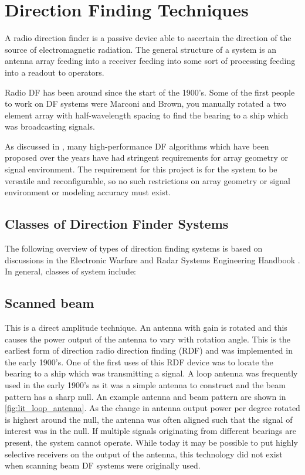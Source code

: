 \section{Direction Finding Techniques}
A radio direction finder is a passive device able to ascertain the direction of the source of electromagnetic radiation. 
The general structure of a system is an antenna array feeding into a receiver feeding into some sort of processing feeding into a readout to operators.

Radio DF has been around since the start of the 1900's. Some of the first people to work on DF  systems were Marconi and Brown, you manually rotated a two element array with half-wavelength spacing to find the bearing to a ship which was broadcasting signals. 

As discussed in \cite{farrier1990direction}, many high-performance DF algorithms which have been proposed over the years have had stringent requirements for array geometry or signal environment. The requirement for this project is for the system to be versatile and reconfigurable, so no such restrictions on array geometry or signal environment or modeling accuracy must exist. 

\subsection{Classes of Direction Finder Systems}
The following overview of types of direction finding systems is based on discussions in the Electronic Warfare and Radar Systems Engineering Handbook \cite{desk1997electronic}.
In general, classes of system include:

\subsection{Scanned beam}
This is a direct amplitude technique. An antenna with gain is rotated and this causes the power output of the antenna to vary with rotation angle. This is the earliest form of direction radio direction finding (RDF)  and was implemented in the early 1900's. One of the first uses of this RDF device was to locate the bearing to a ship which was transmitting a signal. A loop antenna was frequently used in the early 1900's as it was a simple antenna to construct and the beam pattern has a sharp null. An example antenna and beam pattern are shown in \autoref{fig:lit_loop_antenna}. As the change in antenna output power per degree rotated is highest around the null, the antenna was often aligned such that the signal of interest was in the null. If multiple signals originating from different bearings are present, the system cannot operate. While today it may be possible to put highly selective receivers on the output of the antenna, this technology did not exist when scanning beam DF systems were originally used.


